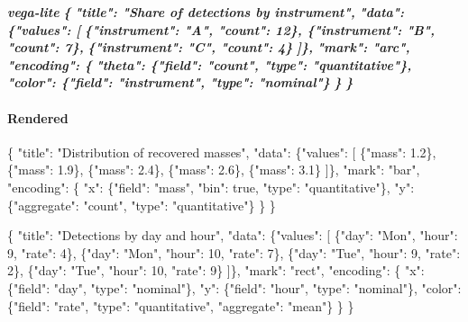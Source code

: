 \documentclass[
]{article}
\newenvironment{Shaded}{}{}
\newcommand{\InformationTok}[1]{\textcolor[rgb]{0.38,0.63,0.69}{\textbf{\textit{#1}}}}
\newcommand{\NormalTok}[1]{#1}
\begin{document}
\begin{Shaded}
\begin{Highlighting}[]
\InformationTok{\textasciigrave{}\textasciigrave{}\textasciigrave{}vega{-}lite}
\InformationTok{\{}
\InformationTok{  "title": "Share of detections by instrument",}
\InformationTok{  "data": \{"values": [}
\InformationTok{    \{"instrument": "A", "count": 12\}, \{"instrument": "B", "count": 7\},}
\InformationTok{    \{"instrument": "C", "count": 4\}}
\InformationTok{  ]\},}
\InformationTok{  "mark": "arc",}
\InformationTok{  "encoding": \{}
\InformationTok{    "theta": \{"field": "count", "type": "quantitative"\},}
\InformationTok{    "color": \{"field": "instrument", "type": "nominal"\}}
\InformationTok{  \}}
\InformationTok{\}}
\InformationTok{\textasciigrave{}\textasciigrave{}\textasciigrave{}}
\end{Highlighting}
\end{Shaded}

\paragraph{Rendered}\label{rendered-7}

\begin{Shaded}
\begin{Highlighting}[]
\NormalTok{\{}
\NormalTok{  "title": "Distribution of recovered masses",}
\NormalTok{  "data": \{"values": [}
\NormalTok{    \{"mass": 1.2\}, \{"mass": 1.9\}, \{"mass": 2.4\}, \{"mass": 2.6\}, \{"mass": 3.1\}}
\NormalTok{  ]\},}
\NormalTok{  "mark": "bar",}
\NormalTok{  "encoding": \{}
\NormalTok{    "x": \{"field": "mass", "bin": true, "type": "quantitative"\},}
\NormalTok{    "y": \{"aggregate": "count", "type": "quantitative"\}}
\NormalTok{  \}}
\NormalTok{\}}
\end{Highlighting}
\end{Shaded}

\begin{Shaded}
\begin{Highlighting}[]
\NormalTok{\{}
\NormalTok{  "title": "Detections by day and hour",}
\NormalTok{  "data": \{"values": [}
\NormalTok{    \{"day": "Mon", "hour": 9, "rate": 4\}, \{"day": "Mon", "hour": 10, "rate": 7\},}
\NormalTok{    \{"day": "Tue", "hour": 9, "rate": 2\}, \{"day": "Tue", "hour": 10, "rate": 9\}}
\NormalTok{  ]\},}
\NormalTok{  "mark": "rect",}
\NormalTok{  "encoding": \{}
\NormalTok{    "x": \{"field": "day", "type": "nominal"\},}
\NormalTok{    "y": \{"field": "hour", "type": "nominal"\},}
\NormalTok{    "color": \{"field": "rate", "type": "quantitative", "aggregate": "mean"\}}
\NormalTok{  \}}
\NormalTok{\}}
\end{Highlighting}
\end{Shaded}
\end{document}
